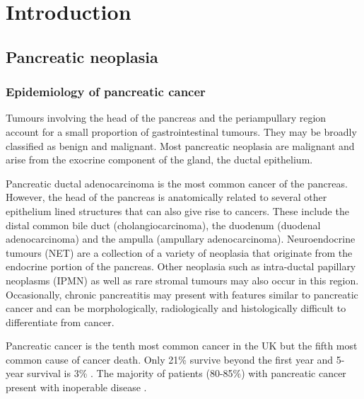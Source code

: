 
\chapter{Introduction}
\label{ch_intro}


\clearpage

\section{Pancreatic neoplasia}

\subsection{Epidemiology of pancreatic cancer}
Tumours involving the head of the pancreas and the periampullary region account for a small proportion of gastrointestinal tumours. 
They may be broadly classified as benign and malignant. 
Most pancreatic neoplasia are malignant and arise from the exocrine component of the gland, the ductal epithelium. 

Pancreatic ductal adenocarcinoma is the most common cancer of the pancreas. 
However, the head of the pancreas is anatomically related to several other epithelium lined structures that can also give rise to cancers. 
These include the distal common bile duct (cholangiocarcinoma), the duodenum (duodenal adenocarcinoma) and the ampulla (ampullary adenocarcinoma). 
Neuroendocrine tumours (NET) are a collection of a variety of neoplasia that originate from the endocrine portion of the pancreas. 
Other neoplasia such as intra-ductal papillary neoplasms (IPMN) as well as rare stromal tumours may also occur in this region. 
Occasionally, chronic pancreatitis may present with features similar to pancreatic cancer and can be morphologically, radiologically and histologically difficult to differentiate from cancer.

Pancreatic cancer is the tenth most common cancer in the UK but the fifth most common cause of cancer death. 
Only 21\% survive beyond the first year and 5-year survival is 3\% \parencite{cancerresearchuk_cancer_2014}. 
The majority of patients (80-85\%) with pancreatic cancer present with inoperable disease \parencite{cancerresearchuk_cancer_2014,sener_pancreatic_1999}. 


